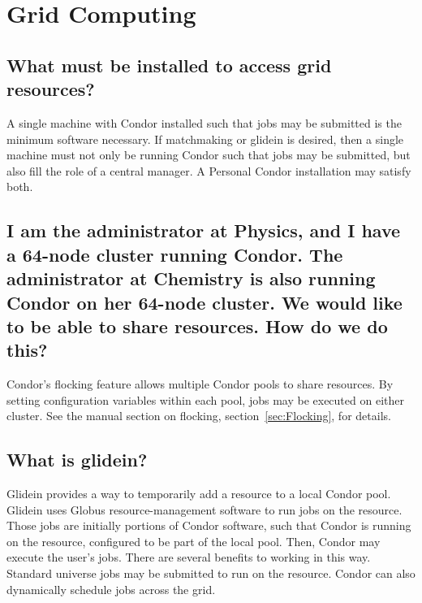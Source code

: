 \section{Grid Computing}


\subsection*{What must be installed to access grid resources?}
A single machine with Condor installed such that jobs may
be submitted is the minimum software necessary.
If matchmaking or glidein is desired,
then a single machine must not only be running Condor
such that jobs may be submitted,
but also fill the role of a central manager.
A Personal Condor installation may satisfy both.

\subsection*{I am the administrator at Physics, and I have a 64-node cluster
running Condor.
The administrator at Chemistry is also running Condor on her 64-node cluster.
We would like to be able to share resources.
How do we do this?}

Condor's flocking feature
allows multiple Condor pools to share resources.
By setting configuration variables within each pool,
jobs may be executed on either cluster.
See the manual section on flocking, section~\ref{sec:Flocking},
for details.

\subsection*{What is glidein?}

Glidein provides a way to temporarily add a resource
to a local Condor pool.
Glidein uses Globus resource-management software to run jobs
on the resource.
Those jobs are initially portions of Condor
software, such that Condor is running on the resource,
configured to be part of the local pool.
Then, Condor may execute the user's jobs.
There are several benefits to working in this way.
Standard universe jobs may be submitted to run on the resource.
Condor can also dynamically schedule jobs across the grid.

